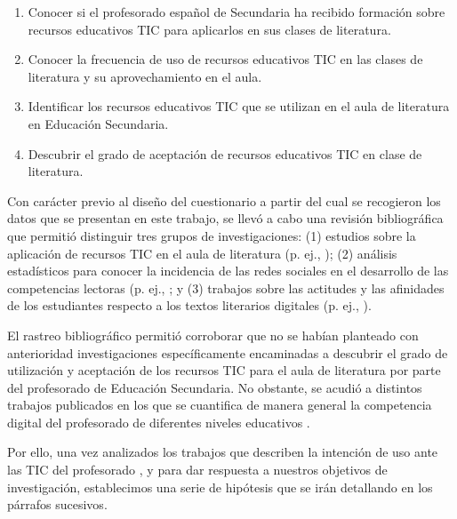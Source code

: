 \documentclass[spanish]{textolivre}
\begin{document}
\begin{enumerate}
    \item Conocer si el profesorado español de Secundaria ha recibido formación sobre recursos educativos TIC para aplicarlos en sus clases de literatura.
    \item Conocer la frecuencia de uso de recursos educativos TIC en las clases de literatura y su aprovechamiento en el aula.
    \item Identificar los recursos educativos TIC que se utilizan en el aula de literatura en Educación Secundaria.
    \item Descubrir el grado de aceptación de recursos educativos TIC en clase de literatura. 
\end{enumerate}

Con carácter previo al diseño del cuestionario a partir del cual se recogieron los datos que se presentan en este trabajo, se llevó a cabo una revisión bibliográfica que permitió distinguir tres grupos de investigaciones: (1) estudios sobre la aplicación de recursos TIC en el aula de literatura (p. ej., \textcite{mula-franco_didactica_2010, jwa_modeling_2012, rovira-collado_aspectos_2016, valero_gomez_educacion_2016, miranda_lacerda_alfabetizacion_2018}); (2) análisis estadísticos para conocer la incidencia de las redes sociales en el desarrollo de las competencias lectoras (p. ej., \textcite{rovira_collado_redes_2015, amiama-espaillat_digital_2017, torres_habitos_2018}; y (3) trabajos sobre las actitudes y las afinidades de los estudiantes respecto a los textos literarios digitales (p. ej., \cite{centro_regional_para_el_fomento_del_libro_en_america_latina_y_el_caribe_bogota_metodologicomun_2014, scolari_adolescentes_2018}). 

El rastreo bibliográfico permitió corroborar que no se habían planteado con anterioridad investigaciones específicamente encaminadas a descubrir el grado de utilización y aceptación de los recursos TIC para el aula de literatura por parte del profesorado de Educación Secundaria. No obstante, se acudió a distintos trabajos publicados en los que se cuantifica de manera general la competencia digital del profesorado de diferentes niveles educativos \cite{almerich_perfiles_2004, prendes-espinosa_competencias_2010, suarez_rodriguez_competencias_2010, dominguez_alfonso_formacion_2011, sanchez_prieto_intencion_2015, nix_collecting_2016}.  

Por ello, una vez analizados los trabajos que describen la intención de uso ante las TIC del profesorado \cite{sanchez_prieto_intencion_2015, nix_collecting_2016}, y para dar respuesta a nuestros objetivos de investigación, establecimos una serie de hipótesis que se irán detallando en los párrafos sucesivos.
\end{document}
